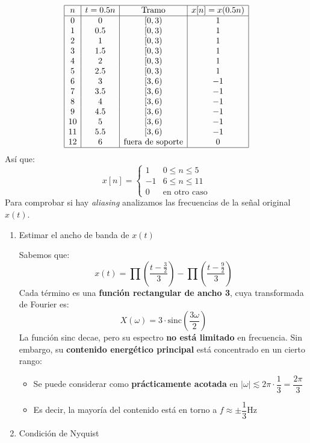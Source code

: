 \begin{enumerate}[label=\color{red}\textbf{\alph*)}]
        \[ 
        \begin{array}{|c|c|c|c|}
        	\hline
        	n & t=0.5n & \text{Tramo} & x[n]=x(0.5n) \\ \hline
        	0 & 0 & [0,3) & 1 \\
        	1 & 0.5 & [0,3) & 1 \\
        	2 & 1 & [0,3) & 1 \\
        	3 & 1.5 & [0,3) & 1 \\
        	4 & 2 & [0,3) & 1 \\
        	5 & 2.5 & [0,3) & 1 \\
        	6 & 3 &  [3,6) & -1 \\
        	7 & 3.5 &  [3,6) & -1 \\
        	8 & 4 &  [3,6) & -1 \\
        	9 & 4.5 &  [3,6) & -1 \\
        	10 & 5 &  [3,6) & -1 \\
        	11 & 5.5 &  [3,6) & -1 \\
        	12 & 6 & \text{fuera de soporte} & 0\\ \hline
        \end{array}
         \]
         Así que: \[
             x[n]=\begin{cases}
                 1 & 0\le n\le 5\\
                 -1 & 6\le n\le 11\\
                 0 & \text{en otro caso}
             \end{cases}
         \] 
         Para comprobar si hay \textit{aliasing} analizamos las frecuencias de la señal original $x(t)$.
         \begin{enumerate}[label=Paso \arabic*:]
             \item Estimar el ancho de banda de $x(t)$

                 Sabemos que:  \[
                 x(t)=\prod\left( \dfrac{t-\frac{3}{2} }{3} \right) -\prod\left( \dfrac{t-\frac{9}{2} }{3} \right) 
                 \] 
                 Cada término es una \textbf{función rectangular de ancho 3}, cuya transformada de Fourier es: \[
                 X(\omega)=3\cdot \text{sinc}\left( \dfrac{3\omega}{2} \right) 
                 \]  
                 La función sinc decae, pero su espectro \textbf{no está limitado} en frecuencia. Sin embargo, su \textbf{contenido energético principal} está concentrado en un cierto rango:
                 \begin{itemize}[label=\textbullet]
                     \item Se puede considerar como \textbf{prácticamente acotada} en $|\omega|\lesssim 2\pi\cdot \dfrac{1}{3}=\dfrac{2\pi}{3}$ 
                     \item Es decir, la mayoría del contenido está en torno a $f\approx \pm \dfrac{1}{3}\text{Hz}$
                 \end{itemize}
             \item Condición de Nyquist


\end{enumerate}
\end{enumerate}
